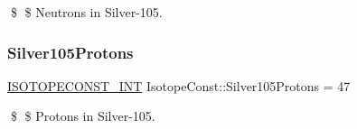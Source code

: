 \$ \$ Neutrons in Silver-\/105. \mbox{\label{group___isotope_const-_silver-_ag105_ga3180a1749374f19c8df6e88fcec707b1}} 
\subsubsection{\texorpdfstring{Silver105\+Protons}{Silver105Protons}}
{\footnotesize\ttfamily \mbox{\hyperlink{group___isotope_const-_macros_ga5f18360b3e99483a35c32d789e62621c}{I\+S\+O\+T\+O\+P\+E\+C\+O\+N\+S\+T\+\_\+\+I\+NT}} Isotope\+Const\+::\+Silver105\+Protons = 47}

\$ \$ Protons in Silver-\/105. 